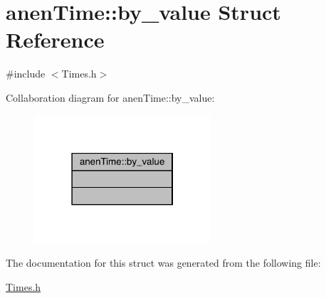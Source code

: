\hypertarget{structanen_time_1_1by__value}{}\section{anen\+Time\+:\+:by\+\_\+value Struct Reference}
\label{structanen_time_1_1by__value}


{\ttfamily \#include $<$Times.\+h$>$}



Collaboration diagram for anen\+Time\+:\+:by\+\_\+value\+:\nopagebreak
\begin{figure}[H]
\begin{center}
\leavevmode
\includegraphics[width=186pt]{structanen_time_1_1by__value__coll__graph}
\end{center}
\end{figure}


The documentation for this struct was generated from the following file\+:\begin{DoxyCompactItemize}
\item 
\mbox{\hyperlink{_times_8h}{Times.\+h}}\end{DoxyCompactItemize}
